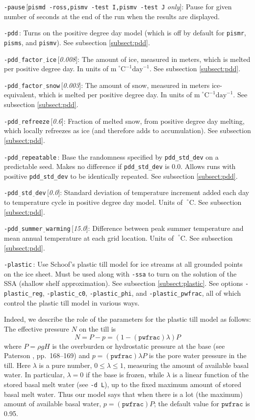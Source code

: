 \documentclass[11pt,final]{amsart}
\newcommand{\rawopt}[1]{\vspace{1mm}\noindent \large\texttt{-#1}\normalsize}
\newcommand{\opt}[1]{\rawopt{#1}\,:\quad}
\newcommand{\optdef}[2]{\rawopt{#1}\,[\textsl{#2}]:\quad}
\newcommand{\optrestrict}[2]{\rawopt{#1}\,[\texttt{#2} \textsl{only}]:\quad}
\newcommand{\und}{$\underline{\,\,\,}$}
\begin{document}
\optrestrict{pause}{pismd -ross,pismv -test I,pismv -test J}    Pause for given number of seconds at the end of the run when the results are displayed.

\opt{pdd}  Turns on the positive degree day model (which is off by default for \verb|pismr|, \verb|pisms|, and \verb|pismv|).  See subsection \ref{subsect:pdd}.

\optdef{pdd\und factor\und ice}{0.008}  The amount of ice, measured in meters, which is melted per positive degree day.  In units of $\text{m}\!\phantom{|}^\circ\text{C}^{-1}\text{day}^{-1}$.  See subsection \ref{subsect:pdd}.

\optdef{pdd\und factor\und snow}{0.003}  The amount of snow, measured in meters ice-equivalent, which is melted per positive degree day.  In units of $\text{m}\phantom{|}^\circ\text{C}^{-1}\text{day}^{-1}$.  See subsection \ref{subsect:pdd}.

\optdef{pdd\und refreeze}{0.6}  Fraction of melted snow, from positive degree day melting, which locally refreezes as ice (and therefore adds to accumulation).  See subsection \ref{subsect:pdd}.

\opt{pdd\und repeatable}  Base the randomness specified by \verb|pdd_std_dev| on a predictable seed.  Makes no difference if \verb|pdd_std_dev| is 0.0.  Allows runs with positive \verb|pdd_std_dev| to be identically repeated.  See subsection \ref{subsect:pdd}.

\optdef{pdd\und std\und dev}{0.0}  Standard deviation of temperature increment added each day to temperature cycle in positive degree day model.  Units of $\phantom{|}^\circ\text{C}$.  See subsection \ref{subsect:pdd}.

\optdef{pdd\und summer\und warming}{15.0}  Difference between peak summer temperature and mean annual temperature at each grid location.  Units of $\phantom{|}^\circ\text{C}$.  See subsection \ref{subsect:pdd}.

\opt{plastic}  Use Schoof's plastic till model for ice streams at all grounded points on the ice sheet.  Must be used along with \verb|-ssa| to turn on the solution of the SSA (shallow shelf approximation).  See subsection \ref{subsect:plastic}.  See options \verb|-plastic_reg|, \verb|-plastic_c0|, \verb|-plastic_phi|, and \verb|-plastic_pwfrac|, all of which control the plastic till model in various ways.

Indeed, we describe the role of the parameters for the plastic till model as follows: The effective pressure $N$ on the till is
	$$N = P - p = (1 - (\mathtt{pwfrac}) \lambda) P$$
where $P = \rho g H$ is the overburden or hydrostatic pressure at the base (see Paterson \cite{Paterson}, pp.~168--169) and $p = (\mathtt{pwfrac}) \lambda P$ is the pore water pressure in the till.  Here $\lambda$ is a pure number, $0\le \lambda \le 1$, measuring the amount of available basal water.  In particular, $\lambda = 0$ if the base is frozen, while $\lambda$ is a linear function of the stored basal melt water (see \verb|-d L|), up to the fixed maximum amount of stored basal melt water.  Thus our model says that when there is a lot (the maximum) amount of available basal water, $p= (\mathtt{pwfrac}) P$; the default value for $\mathtt{pwfrac}$ is 0.95.
\end{document}
